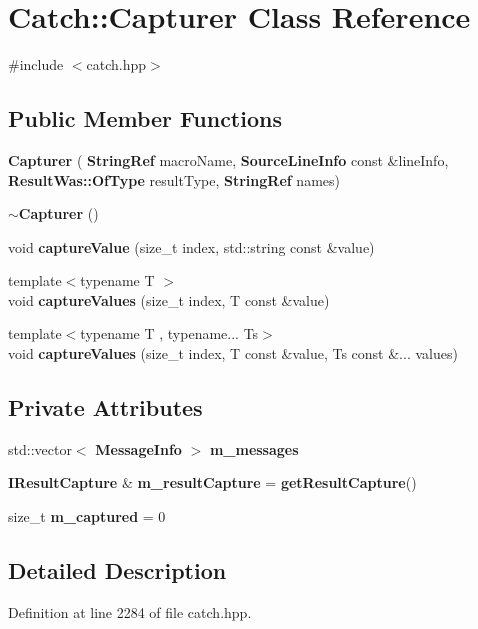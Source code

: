\section{Catch\+::Capturer Class Reference}
\label{class_catch_1_1_capturer}


{\ttfamily \#include $<$catch.\+hpp$>$}

\subsection*{Public Member Functions}
\begin{DoxyCompactItemize}
\item 
\textbf{ Capturer} (\textbf{ String\+Ref} macro\+Name, \textbf{ Source\+Line\+Info} const \&line\+Info, \textbf{ Result\+Was\+::\+Of\+Type} result\+Type, \textbf{ String\+Ref} names)
\item 
\textbf{ $\sim$\+Capturer} ()
\item 
void \textbf{ capture\+Value} (size\+\_\+t index, std\+::string const \&value)
\item 
{\footnotesize template$<$typename T $>$ }\\void \textbf{ capture\+Values} (size\+\_\+t index, T const \&value)
\item 
{\footnotesize template$<$typename T , typename... Ts$>$ }\\void \textbf{ capture\+Values} (size\+\_\+t index, T const \&value, Ts const \&... values)
\end{DoxyCompactItemize}
\subsection*{Private Attributes}
\begin{DoxyCompactItemize}
\item 
std\+::vector$<$ \textbf{ Message\+Info} $>$ \textbf{ m\+\_\+messages}
\item 
\textbf{ I\+Result\+Capture} \& \textbf{ m\+\_\+result\+Capture} = \textbf{ get\+Result\+Capture}()
\item 
size\+\_\+t \textbf{ m\+\_\+captured} = 0
\end{DoxyCompactItemize}


\subsection{Detailed Description}


Definition at line 2284 of file catch.\+hpp.



